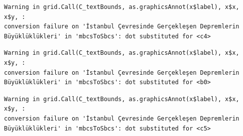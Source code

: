 \documentclass[
  11pt,
  a4paper,
  DIV=11,
  numbers=noendperiod]{scrartcl}
\newenvironment{Shaded}{\begin{snugshade}}{\end{snugshade}}
\newcommand{\AttributeTok}[1]{\textcolor[rgb]{0.40,0.45,0.13}{#1}}
\newcommand{\CommentTok}[1]{\textcolor[rgb]{0.37,0.37,0.37}{#1}}
\newcommand{\DecValTok}[1]{\textcolor[rgb]{0.68,0.00,0.00}{#1}}
\newcommand{\FloatTok}[1]{\textcolor[rgb]{0.68,0.00,0.00}{#1}}
\newcommand{\FunctionTok}[1]{\textcolor[rgb]{0.28,0.35,0.67}{#1}}
\newcommand{\NormalTok}[1]{\textcolor[rgb]{0.00,0.23,0.31}{#1}}
\newcommand{\OtherTok}[1]{\textcolor[rgb]{0.00,0.23,0.31}{#1}}
\newcommand{\SpecialCharTok}[1]{\textcolor[rgb]{0.37,0.37,0.37}{#1}}
\newcommand{\StringTok}[1]{\textcolor[rgb]{0.13,0.47,0.30}{#1}}
\begin{document}
\begin{Shaded}
\end{Shaded}

\begin{verbatim}
Warning in grid.Call(C_textBounds, as.graphicsAnnot(x$label), x$x, x$y, :
conversion failure on 'İstanbul Çevresinde Gerçekleşen Depremlerin
Büyüklüklükleri' in 'mbcsToSbcs': dot substituted for <c4>
\end{verbatim}

\begin{verbatim}
Warning in grid.Call(C_textBounds, as.graphicsAnnot(x$label), x$x, x$y, :
conversion failure on 'İstanbul Çevresinde Gerçekleşen Depremlerin
Büyüklüklükleri' in 'mbcsToSbcs': dot substituted for <b0>
\end{verbatim}

\begin{verbatim}
Warning in grid.Call(C_textBounds, as.graphicsAnnot(x$label), x$x, x$y, :
conversion failure on 'İstanbul Çevresinde Gerçekleşen Depremlerin
Büyüklüklükleri' in 'mbcsToSbcs': dot substituted for <c5>
\end{verbatim}
\end{document}
